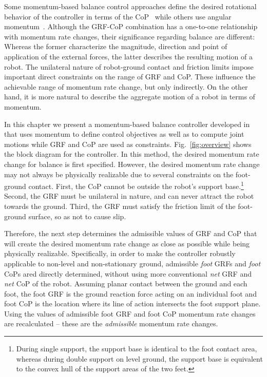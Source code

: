 \documentclass{llncs}
\begin{document}
Some momentum-based balance control approaches define the desired rotational
behavior of the controller in terms of the CoP~\cite{AG05,Macchietto09}
while others use angular momentum~\cite{KKKFHYH03}.
Although the GRF-CoP combination has a one-to-one relationship
with momentum rate changes, their significance regarding
balance are different: Whereas the former characterize the magnitude, direction and
point of application of
the external forces, the latter describes the resulting motion of a robot.
The unilateral nature of robot-ground contact and friction limits
impose important direct constraints on the range of GRF and CoP.
 These influence the achievable range of momentum rate change,
 but only indirectly. On the other hand, it is more natural to describe
the aggregate motion of a robot in terms of momentum.


In this chapter we present a momentum-based balance controller developed in~\cite{LG12}
that uses momentum to define control objectives as well as to compute joint motions
while GRF and CoP are used as constraints.
Fig.~\ref{fig:overview} shows the block diagram for the controller.
In this method, the desired momentum rate change for balance is first specified.
However, the desired momentum rate change may not always be physically
realizable due to several constraints on the foot-ground
contact. First, the CoP cannot be outside the
robot's support base.\footnote{ During single support, the support base is identical to
the foot contact area, whereas during double support on level ground,
the support base is equivalent to the
convex hull of the support areas of the two feet.}
Second, the GRF must be unilateral in nature, and can never attract the
robot towards the ground. Third, the GRF must satisfy the friction
limit of the foot-ground surface, so as not to cause slip.

Therefore, the next step determines the admissible values of GRF
and CoP that will create the desired momentum rate change as close
as possible while being physically realizable.
Specifically, in order to make the controller robustly applicable to non-level
and non-stationary ground, admissible \emph{foot} GRFs and \emph{foot} CoPs
ared directly determined,
without using more conventional \emph{net} GRF and \emph{net} CoP of the robot.
Assuming planar contact between the ground and each foot, the foot GRF is the ground
reaction force acting on an individual foot and foot CoP
is the location where its line of action intersects the foot
support plane.
Using the values of admissible foot GRF and foot CoP 
momentum rate changes are recalculated -- these are the \emph{admissible} momentum rate changes.
\end{document}
